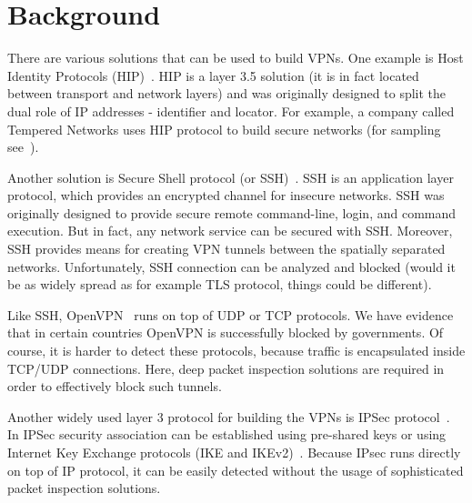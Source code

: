 \section{Background}
\label{section:background}

There are various solutions that can be used to build VPNs. One example is 
Host Identity Protocols (HIP)~\cite{gurtov2008host}. HIP is a layer 3.5 
solution (it is in fact located between transport and network layers) and 
was originally designed to split the dual role of IP addresses - identifier 
and locator. For example, a company called Tempered Networks uses HIP 
protocol to build secure networks (for sampling see~\cite{temperednetworks}).

Another solution is Secure Shell protocol (or SSH)~\cite{ssh}. SSH is an 
application layer protocol, which provides an encrypted channel for insecure 
networks. SSH was originally designed to provide secure remote command-line, 
login, and command execution. But in fact,  any network service can be secured 
with SSH. Moreover, SSH provides means for creating VPN tunnels between the 
spatially separated networks. Unfortunately, SSH connection can be analyzed 
and blocked (would it be as widely spread as for example  TLS protocol, 
things could be different).

Like SSH, OpenVPN~\cite{openvpn} runs on top of UDP or TCP protocols.
We have evidence that in certain countries OpenVPN is successfully blocked 
by governments. Of course, it is harder to detect these protocols, because 
traffic is encapsulated inside TCP/UDP connections. Here, deep packet 
inspection solutions are required in order to effectively block such tunnels.

Another widely used layer 3 protocol for building the VPNs is IPSec 
protocol~\cite{ipsec}. In IPSec security association can be established 
using pre-shared keys or using Internet Key Exchange protocols (IKE and 
IKEv2)~\cite{ike}. Because IPsec runs directly on top of IP protocol, it 
can be easily detected without the usage of sophisticated packet inspection 
solutions.
  